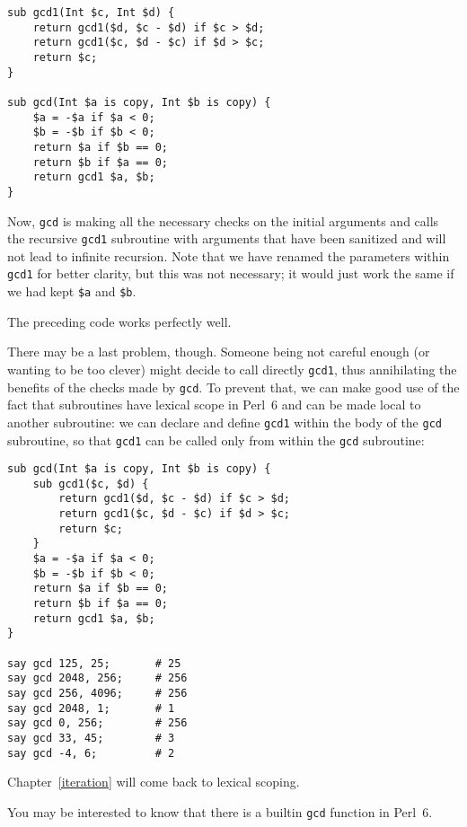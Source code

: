 \begin{verbatim}
sub gcd1(Int $c, Int $d) {
    return gcd1($d, $c - $d) if $c > $d;
    return gcd1($c, $d - $c) if $d > $c;
    return $c;
}

sub gcd(Int $a is copy, Int $b is copy) { 
    $a = -$a if $a < 0;
    $b = -$b if $b < 0;
    return $a if $b == 0;
    return $b if $a == 0;
    return gcd1 $a, $b;
}
\end{verbatim}
%

Now, {\tt gcd} is making all the necessary checks on the 
initial arguments and calls the recursive {\tt gcd1} 
subroutine with arguments that have been sanitized and 
will not lead to infinite recursion. Note that we have 
renamed the parameters within {\tt gcd1} for better 
clarity, but this was not necessary; it would just work 
the same if we had kept {\tt \$a} and {\tt \$b}.

The preceding code works perfectly well.

There may be a last problem, though. Someone being not 
careful enough (or wanting to be too clever) might decide 
to call directly {\tt gcd1}, thus annihilating the benefits 
of the checks made by {\tt gcd}. To prevent that, we can make good 
use of the fact that subroutines have lexical scope in Perl~6 
and can be made local to another subroutine: we can declare 
and define {\tt gcd1} within the body of the {\tt gcd} 
subroutine, so that {\tt gcd1} can be called only from 
within the {\tt gcd} subroutine:

\begin{verbatim}
sub gcd(Int $a is copy, Int $b is copy) { 
    sub gcd1($c, $d) {
        return gcd1($d, $c - $d) if $c > $d;
        return gcd1($c, $d - $c) if $d > $c;
        return $c;
    }
    $a = -$a if $a < 0;
    $b = -$b if $b < 0;
    return $a if $b == 0;
    return $b if $a == 0;
    return gcd1 $a, $b;
}

say gcd 125, 25;       # 25
say gcd 2048, 256;     # 256
say gcd 256, 4096;     # 256
say gcd 2048, 1;       # 1
say gcd 0, 256;        # 256
say gcd 33, 45;        # 3
say gcd -4, 6;         # 2
\end{verbatim}

Chapter~\ref{iteration} will come back to lexical scoping.


You may be interested to know that there is a builtin {\tt gcd} 
function in Perl~6.


